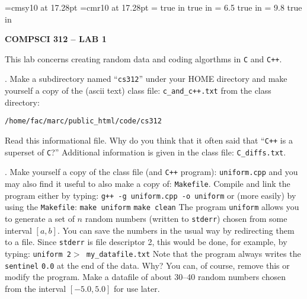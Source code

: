 %
%
\def\scriptA{{\cal A}}   %
\def\boldN{{\bf N}}
\def\boldR{{\bf R}}
\def\boldRP{{\bf R}$^+$}   %
\def\boldC{{\bf C}}
%
\def\eop{\vrule height10pt width6pt depth0pt}
\def\mapleft#1{\ \smash{\mathop{\longleftarrow}\limits^{#1}}\ }
%
%
%
\font\bigcal=cmsy10 at 17.28pt
\font\bigrm=cmr10 at 17.28pt
%
\magnification=   %
\nopagenumbers             %
 true in
 true in
\hsize = 6.5 true in       %
\vsize = 9.8 true in       %
\baselineskip12pt          %
\parskip4pt                %
\null
\centerline{\bf COMPSCI 312 -- LAB 1}
\vskip5pt

\noindent
   This lab concerns creating random data and
coding algorthms in {\tt C} and {\tt C++}.

. Make a subdirectory named ``{\tt cs312}'' under your HOME directory 
  and make yourself a copy of the (ascii text) class
  file: {\tt c\_and\_c++.txt} from the class directory: \hfil\break
\centerline{\tt /home/fac/marc/public\_html/code/cs312} 
Read this informational file. Why do you think that it often
said that ``{\tt C++} is a superset of {\tt C}?'' Additional
information is given in the class file: {\tt C\_diffs.txt}.

. Make yourself a copy of the class file (and {\tt C++} program): 
 {\tt uniform.cpp} and
 you may also find it useful to also make a copy of: {\tt Makefile}. 
 Compile and link the program either by typing: \hfil\break
 {\tt g++ -g uniform.cpp -o uniform} \hfill\break
 or (more easily) by using the {\tt Makefile}: \hfil\break
 {\tt make uniform} \hfil\break
 {\tt make clean} \hfil\break
 The program {\tt uniform} allows you to generate a set of $ n $ random 
 numbers (written to {\tt stderr}) chosen from 
 some interval $ [a, b] $. You can 
 save the numbers in the usual way by redirecting them to a file. Since
 {\tt stderr} is file descriptor 2, this would be done, for example, by
 typing: \hfil\break
 {\tt uniform 2$>$ my\_datafile.txt} \hfil\break
 Note that the program always writes the {\tt sentinel} {\tt 0.0}
 at the end of the data. Why? You can, of course, remove this
 or modify the program. Make a datafile of about 30--40 random
 numbers chosen from the interval $[-5.0 , 5.0]$ for use later.

